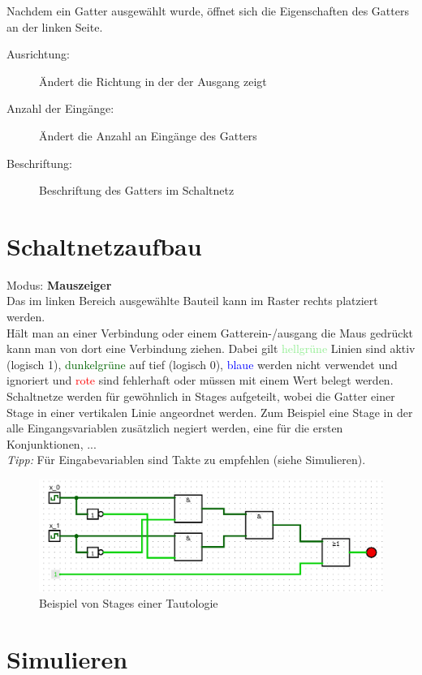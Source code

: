 \documentclass[a4paper]{scrartcl}
\begin{document}
	Nachdem ein Gatter ausgewählt wurde, öffnet sich die Eigenschaften des Gatters an der linken Seite.
	
	\begin{description}
		\item[Ausrichtung:] Ändert die Richtung in der der Ausgang zeigt
		\item[Anzahl der Eingänge:] Ändert die Anzahl an Eingänge des Gatters
		\item[Beschriftung:] Beschriftung des Gatters im Schaltnetz
	\end{description}


\section*{Schaltnetzaufbau}
	Modus: \textbf{Mauszeiger} \\
	Das im linken Bereich ausgewählte Bauteil kann im Raster rechts platziert werden. \\
	Hält man an einer Verbindung oder einem Gatterein-/ausgang die Maus gedrückt kann man von dort eine Verbindung ziehen. Dabei gilt \textcolor{lightgreen}{hellgrüne} Linien sind aktiv (logisch 1), \textcolor{darkgreen}{dunkelgrüne} auf tief (logisch 0), \textcolor{blue}{blaue} werden nicht verwendet und ignoriert und \textcolor{red}{rote} sind fehlerhaft oder müssen mit einem Wert belegt werden. \\
	Schaltnetze werden für gewöhnlich in Stages aufgeteilt, wobei die Gatter einer Stage in einer vertikalen Linie angeordnet werden. Zum Beispiel eine Stage in der alle Eingangsvariablen zusätzlich negiert werden, eine für die ersten Konjunktionen, ...\\
	\textit{Tipp:} Für Eingabevariablen sind Takte zu empfehlen (siehe Simulieren).
	
	\begin{figure}[H]
		\centering
		\includegraphics[width=\textwidth]{Tautologie.png}
		\caption{Beispiel von Stages einer Tautologie}
	\end{figure} 
	

\section*{Simulieren}
\end{document}
